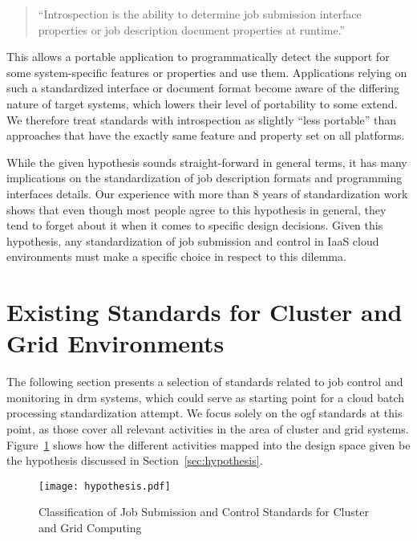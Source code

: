 \documentclass[twocolumn]{svjour3}       %
\begin{document}
\begin{quote}
``Introspection is the ability to determine job submission interface properties or job description document properties at runtime.''
\end{quote}

This allows a portable application to programmatically detect the support for some system-specific features or properties and use them. Applications relying on such a standardized interface or document format become aware of the differing nature of target systems, which lowers their level of portability to some extend. We therefore treat standards with introspection as slightly ``less portable'' than approaches that have the exactly same feature and property set on all platforms.



While the given hypothesis sounds straight-forward in general terms, it has many implications on the standardization of job description formats and programming interfaces details. Our experience with more than 8 years of standardization work shows that even though most people agree to this hypothesis in general, they tend to forget about it when it comes to specific design decisions. Given this hypothesis, any standardization of job submission and control in IaaS cloud environments must make a specific choice in respect to this dilemma.  


\section{Existing Standards for Cluster and Grid Environments}
\label{sec:relatedwork}

The following section presents a selection of standards related to job control and monitoring in \gls{drm} systems, which could serve as starting point for a cloud batch processing standardization attempt. We focus solely on the \gls{ogf} standards at this point, as those cover all relevant activities in the area of cluster and grid systems. Figure~\ref{fig:hypothesis} shows how the different activities mapped into the design space given be the hypothesis discussed in Section~\ref{sec:hypothesis}. 

\begin{figure}
  \texttt{[image: hypothesis.pdf]}
\caption{Classification of Job Submission and Control Standards for Cluster and Grid Computing}
\label{fig:hypothesis} 
\end{figure}
\end{document}
